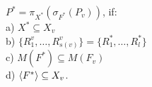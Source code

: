 \begin{theorem}
$P^{\ast} = \pi_{X^{\ast}} (\sigma_{F^{\ast}} (P_{v}))$, if:
\\a) $X^{\ast} \subseteq X_{v}$
\\b) $\{R^{v}_{1}, \ldots, R^{v}_{s(v)}\} = \{R^{\ast}_{1}, \ldots,
R^{\ast}_{l}\}$
\\c) $M (F^{\ast}) \subseteq M (F_{v}) $
\\d) $ \<F^{\ast}> \subseteq X_{v} $.
\label{th_base_eq}
\end{theorem}
